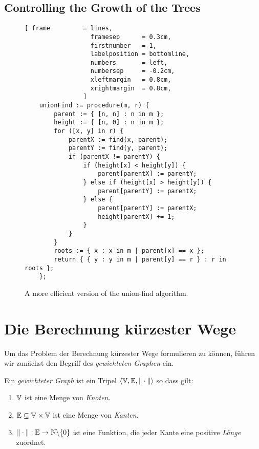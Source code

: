 \subsection{Controlling the Growth of the Trees}
\begin{figure}[!ht]
\centering
\begin{Verbatim}[ frame         = lines, 
                  framesep      = 0.3cm, 
                  firstnumber   = 1,
                  labelposition = bottomline,
                  numbers       = left,
                  numbersep     = -0.2cm,
                  xleftmargin   = 0.8cm,
                  xrightmargin  = 0.8cm,
                ]
    unionFind := procedure(m, r) {
        parent := { [n, n] : n in m };
        height := { [n, 0] : n in m };
        for ([x, y] in r) {
            parentX := find(x, parent);
            parentY := find(y, parent);
            if (parentX != parentY) {
                if (height[x] < height[y]) {
                    parent[parentX] := parentY;  
                } else if (height[x] > height[y]) {
                    parent[parentY] := parentX;  
                } else {
                    parent[parentY] := parentX;  
                    height[parentX] += 1;
                }
            }
        }
        roots := { x : x in m | parent[x] == x };
        return { { y : y in m | parent[y] == r } : r in roots };
    };
\end{Verbatim}
\vspace*{-0.3cm}
\caption{A more efficient version of the union-find algorithm.}
\label{fig:union-find.stlx}
\end{figure}



\section[Shortest Paths]{Die Berechnung k\"urzester Wege}
Um das Problem der Berechnung k\"urzester Wege formulieren zu k\"onnen, f\"uhren wir zun\"achst 
den Begriff des \emph{gewichteten Graphen} ein.  

\begin{Definition} \lb
  Ein  {\em gewichteter Graph} ist ein Tripel 
   $\langle {\mathbb V}, {\mathbb E}, \|\cdot\| \rangle$ so dass gilt:
  \begin{enumerate}
  \item ${\mathbb V}$ ist eine Menge von \emph{Knoten}.
  \item ${\mathbb E} \subseteq {\mathbb V} \times {\mathbb V}$ ist eine Menge von \emph{Kanten}.
  \item $\|\cdot\|: {\mathbb E} \rightarrow {\mathbb N} \backslash\{0\}$ ist eine Funktion,
        die jeder Kante eine positive \emph{L\"ange} zuordnet.
        \conclude
  \end{enumerate}
\end{Definition}

